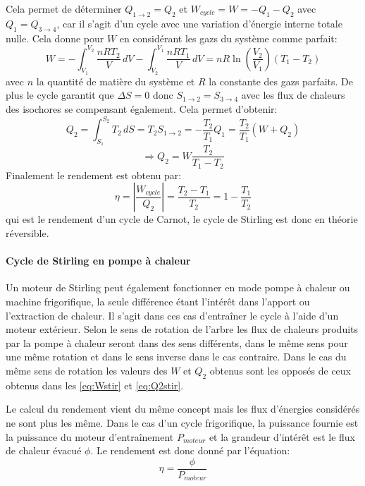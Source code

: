 Cela permet de déterminer \(Q_{1\to2} = Q_2\) et \(W_{cycle} = W = -Q_1 - Q_2\) avec \(Q_1 = Q_{3\to4}\), car il s'agit d'un cycle avec une variation d'énergie interne totale nulle. Cela donne pour \(W\) en considérant les gazs du système comme parfait:
\begin{equation}
    W = - \int_{V_1}^{V_2} \frac{nRT_2}{V} \, dV - \int_{V_2}^{V_1} \frac{nRT_1}{V} \, dV = nR\ln\left(\frac{V_2}{V_1}\right) (T_1 - T_2)
    \label{eq:Wstir}
\end{equation}
avec \(n\) la quantité de matière du système et \(R\) la constante des gazs parfaits.
De plus le cycle garantit que \(\Delta S = 0\) donc \(S_{1\to2} = S_{3\to4}\) avec les flux de chaleurs des isochores se compensant également. Cela permet d'obtenir:
\begin{equation}
    Q_2 = \int_{S_1}^{S_2} T_2 \, dS = T_2 S_{1\to2} = -\frac{T_2}{T_1} Q_1 = \frac{T_2}{T_1} (W + Q_2)
\end{equation}
\begin{equation}
    \Rightarrow Q_2 = W \frac{T_2}{T_1 - T_2}
    \label{eq:Q2stir}
\end{equation}
Finalement le rendement est obtenu par:
\begin{equation}
    \eta = \left|\frac{W_{cycle}}{Q_2}\right| = \frac{T_2 - T_1}{T_2} = 1 - \frac{T_1}{T_2}
\end{equation}
qui est le rendement d'un cycle de Carnot, le cycle de Stirling est donc en théorie réversible.



\paragraph*{Cycle de Stirling en pompe à chaleur}
Un moteur de Stirling peut également fonctionner en mode pompe à chaleur ou machine frigorifique, la seule différence étant l'intérêt dans l'apport ou l'extraction de chaleur. Il s'agit dans ces cas d'entraîner le cycle à l'aide d'un moteur extérieur. Selon le sens de rotation de l'arbre les flux de chaleurs produits par la pompe à chaleur seront dans des sens différents, dans le même sens pour une même rotation et dans le sens inverse dans le cas contraire. Dans le cas du même sens de rotation les valeurs des \(W\) et \(Q_2\) obtenus sont les opposés de ceux obtenus dans les \autoref{eq:Wstir} et \autoref{eq:Q2stir}.

Le calcul du rendement vient du même concept mais les flux d'énergies considérés ne sont plus les même. Dans le cas d'un cycle frigorifique, la puissance fournie est la puissance du moteur d'entraînement \(P_{moteur}\) et la grandeur d'intérêt est le flux de chaleur évacué \(\phi\). Le rendement est donc donné par l'équation:
\begin{equation}
    \eta = \frac{\phi}{P_{moteur}}
    \label{eq:rend-frigo}
\end{equation}